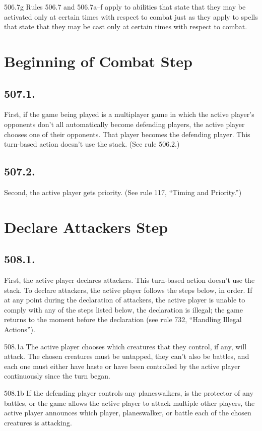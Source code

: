 506.7g Rules 506.7 and 506.7a–f apply to abilities that state that they may be activated only at certain times with respect to combat just as they apply to spells that state that they may be cast only at certain times with respect to combat.

\section{Beginning of Combat Step}
\subsection*{507.1.}
First, if the game being played is a multiplayer game in which the active player’s opponents don’t all automatically become defending players, the active player chooses one of their opponents. That player becomes the defending player. This turn-based action doesn’t use the stack. (See rule 506.2.)

\subsection*{507.2.}
Second, the active player gets priority. (See rule 117, “Timing and Priority.”)

\section{Declare Attackers Step}
\subsection*{508.1.}
First, the active player declares attackers. This turn-based action doesn’t use the stack. To declare attackers, the active player follows the steps below, in order. If at any point during the declaration of attackers, the active player is unable to comply with any of the steps listed below, the declaration is illegal; the game returns to the moment before the declaration (see rule 732, “Handling Illegal Actions”).

508.1a The active player chooses which creatures that they control, if any, will attack. The chosen creatures must be untapped, they can’t also be battles, and each one must either have haste or have been controlled by the active player continuously since the turn began.

508.1b If the defending player controls any planeswalkers, is the protector of any battles, or the game allows the active player to attack multiple other players, the active player announces which player, planeswalker, or battle each of the chosen creatures is attacking.

